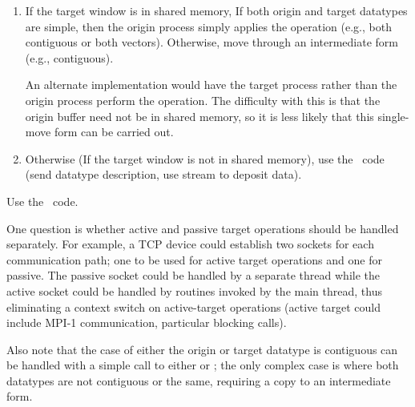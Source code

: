 \documentclass{article}
\begin{document}
\begin{shmem}
\begin{enumerate}
\item If the target window is in shared memory, 
If both origin and target datatypes are simple, then the origin process simply
applies the 
operation (e.g., both contiguous or both vectors).  Otherwise, move through an
intermediate form (e.g., contiguous).  

An alternate implementation would have the target process rather than the
origin process perform the operation.  The difficulty with this is that the
origin buffer need not be in shared memory, so it is less likely that this
single-move form can be carried out.

\item Otherwise (If the target window is not in shared memory),
use the \tcpname\ code (send datatype description, use stream to deposit
data).

\end{enumerate}
\end{shmem}
\begin{via}
Use the \tcpname\ code.  
\end{via}

One question is whether active and passive target operations should be handled
separately.  For example, a TCP device could establish two sockets for each
communication path; one to be used for active target operations and one for
passive.  The passive socket could be handled by a separate thread while the
active socket could be handled by routines invoked by the main thread, thus
eliminating a context switch on active-target operations (active target could
include MPI-1 communication, particular blocking calls).

Also note that the case of either the origin or target datatype is
contiguous can be handled with a simple call to either
 or ; the only complex case
is where both datatypes are not contiguous or the same, requiring a
copy to an intermediate form.
\end{document}
